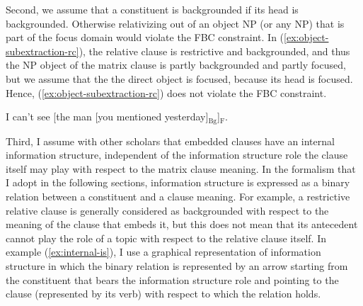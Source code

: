 Second, we assume that a constituent is backgrounded if its head is backgrounded. Otherwise relativizing out of an object NP (or any NP) that is part of the focus domain would violate the FBC constraint. In (\ref{ex:object-subextraction-rc}), the relative clause is restrictive and backgrounded, and thus the NP object of the matrix clause is partly backgrounded and partly focused, but we assume that the the direct object is focused, because its head is focused. Hence, (\ref{ex:object-subextraction-rc}) does not violate the FBC constraint. 

\ea I can't see [the man [you mentioned yesterday]$_{\text{Bg}}$]$_{\text{F}}$.
\label{ex:object-subextraction-rc}
\z 

Third, \label{ch:is-internal} 
I assume with other scholars \citep[a.o.][]{Lahousse.2011,Song.2017} that embedded clauses have an internal information structure, independent of the information structure role the clause itself may play with respect to the matrix clause meaning. In the formalism that I adopt in the following sections, information structure is expressed as a binary relation between a constituent and a clause meaning. For example, a restrictive relative clause is generally considered as backgrounded with respect to the meaning of the clause that embeds it, but this does not mean that its antecedent cannot play the role of a topic with respect to the relative clause itself. In example (\ref{ex:internal-is}), I use a graphical representation of information structure in which the binary relation is represented by an arrow starting from the constituent that bears the information structure role and pointing to the clause (represented by its verb) with respect to which the relation holds.

\ea \label{ex:internal-is}
\z 

